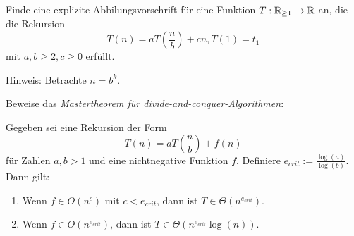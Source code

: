 
\begin{sheet}

\begin{problem}
Finde eine explizite Abbilungsvorschrift für eine Funktion $T: \mathbb{R}_{\geq 1} \to \mathbb{R}$ an, die die Rekursion
\[T(n) = a T\left(\frac{n}{b}\right) + cn, T(1)=t_1\]
mit $a,b\geq 2, c\geq 0$ erfüllt.

Hinweis: Betrachte $n=b^k$.
\end{problem}

\begin{problem}[title={Mastertheorem}]\label{ex:mastertheorem}
Beweise das \emph{Mastertheorem für divide-and-conquer-Algorithmen}:

Gegeben sei eine Rekursion der Form
\[T(n) = a T\left(\frac{n}{b}\right) + f(n)\]
für Zahlen $a,b>1$ und eine nichtnegative Funktion $f$. Definiere $e_{crit} := \frac{\log(a)}{\log(b)}$. Dann gilt:
\begin{enumerate}
\item Wenn $f\in O(n^c)$ mit $c<e_{crit}$, dann ist $T\in\Theta(n^{e_{crit}})$.
\item Wenn $f\in O(n^{e_{crit}})$, dann ist $T\in\Theta(n^{e_{crit}} \log(n))$.
\end{enumerate}
\end{problem}

\end{sheet}